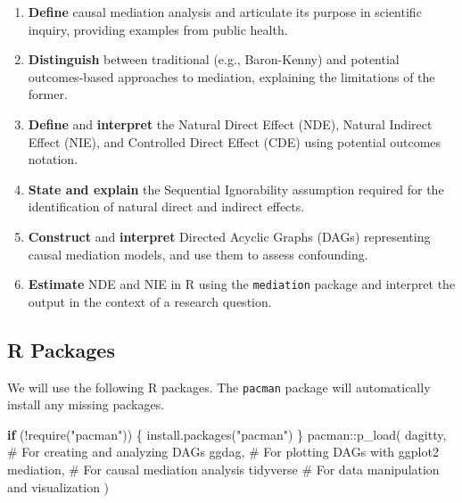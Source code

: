 \documentclass[
  10pt,
  letterpaper,
  DIV=11,
  numbers=noendperiod,
  oneside]{scrartcl}
\newenvironment{Shaded}{\begin{snugshade}}{\end{snugshade}}
\newcommand{\CommentTok}[1]{\textcolor[rgb]{0.37,0.37,0.37}{#1}}
\newcommand{\ControlFlowTok}[1]{\textcolor[rgb]{0.00,0.23,0.31}{\textbf{#1}}}
\newcommand{\FunctionTok}[1]{\textcolor[rgb]{0.28,0.35,0.67}{#1}}
\newcommand{\NormalTok}[1]{\textcolor[rgb]{0.00,0.23,0.31}{#1}}
\newcommand{\SpecialCharTok}[1]{\textcolor[rgb]{0.37,0.37,0.37}{#1}}
\newcommand{\StringTok}[1]{\textcolor[rgb]{0.13,0.47,0.30}{#1}}
\providecommand{\tightlist}{%
  \setlength{\itemsep}{0pt}\setlength{\parskip}{0pt}}
\begin{document}
\begin{enumerate}
\def\labelenumi{\arabic{enumi}.}
\tightlist
\item
  \textbf{Define} causal mediation analysis and articulate its purpose
  in scientific inquiry, providing examples from public health.
\item
  \textbf{Distinguish} between traditional (e.g., Baron-Kenny) and
  potential outcomes-based approaches to mediation, explaining the
  limitations of the former.
\item
  \textbf{Define} and \textbf{interpret} the Natural Direct Effect
  (NDE), Natural Indirect Effect (NIE), and Controlled Direct Effect
  (CDE) using potential outcomes notation.
\item
  \textbf{State and explain} the Sequential Ignorability assumption
  required for the identification of natural direct and indirect
  effects.
\item
  \textbf{Construct} and \textbf{interpret} Directed Acyclic Graphs
  (DAGs) representing causal mediation models, and use them to assess
  confounding.
\item
  \textbf{Estimate} NDE and NIE in R using the \texttt{mediation}
  package and interpret the output in the context of a research
  question.
\end{enumerate}

\subsection{R Packages}\label{r-packages}

We will use the following R packages. The \texttt{pacman} package will
automatically install any missing packages.

\begin{Shaded}
\begin{Highlighting}[]
\ControlFlowTok{if}\NormalTok{ (}\SpecialCharTok{!}\FunctionTok{require}\NormalTok{(}\StringTok{"pacman"}\NormalTok{)) \{}
  \FunctionTok{install.packages}\NormalTok{(}\StringTok{"pacman"}\NormalTok{)}
\NormalTok{\}}
\NormalTok{pacman}\SpecialCharTok{::}\FunctionTok{p\_load}\NormalTok{(}
\NormalTok{  dagitty, }\CommentTok{\# For creating and analyzing DAGs}
\NormalTok{  ggdag, }\CommentTok{\# For plotting DAGs with ggplot2}
\NormalTok{  mediation, }\CommentTok{\# For causal mediation analysis}
\NormalTok{  tidyverse }\CommentTok{\# For data manipulation and visualization}
\NormalTok{)}
\end{Highlighting}
\end{Shaded}
\end{document}
